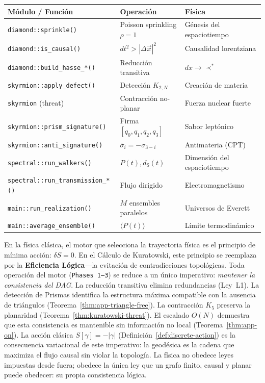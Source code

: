 \documentclass[11pt, a4paper, openany]{book}
\newcommand{\dS}{d_{\mathrm{S}}}
\newcommand{\covers}{\prec^{\!*}}
\begin{document}
\medskip
\begin{center}
\small
\begin{tabular}{p{4.5cm}ll}
\toprule
\textbf{M\'odulo / Funci\'on} & \textbf{Operaci\'on} &
  \textbf{F\'isica} \\
\midrule
\texttt{diamond::sprinkle()}
  & Poisson sprinkling $\rho = 1$
  & G\'enesis del espaciotiempo \\
\texttt{diamond::is\_causal()}
  & $dt^2 > |\Delta\vec{x}|^2$
  & Causalidad lorentziana \\
\texttt{diamond::build\_hasse\_*()}
  & Reducci\'on transitiva
  & $dx \to \covers$ \\
\texttt{skyrmion::apply\_defect()}
  & Detecci\'on $K_{2,N}$
  & Creaci\'on de materia \\
\texttt{skyrmion} (threat)
  & Contracci\'on no-planar
  & Fuerza nuclear fuerte \\
\texttt{skyrmion::prism\_signature()}
  & Firma $[q_0,q_1,q_2,q_3]$
  & Sabor lept\'onico \\
\texttt{skyrmion::anti\_signature()}
  & $\bar{\sigma}_i = -\sigma_{3-i}$
  & Antimateria (CPT) \\
\texttt{spectral::run\_walkers()}
  & $P(t), \dS(t)$
  & Dimensi\'on del espaciotiempo \\
\texttt{spectral::run\_transmission\_*()}
  & Flujo dirigido
  & Electromagnetismo \\
\texttt{main::run\_realization()}
  & $M$ ensembles paralelos
  & Universos de Everett \\
\texttt{main::average\_ensemble()}
  & $\langle P(t)\rangle$
  & L\'imite termodin\'amico \\
\bottomrule
\end{tabular}
\end{center}

\bigskip\noindent
\begin{result}[title={Eficiencia L\'ogica como Motor de la
F\'isica}]
\label{res:logical-efficiency}
En la f\'isica cl\'asica, el motor que selecciona la trayectoria
f\'isica es el principio de m\'inima acci\'on: $\delta S = 0$.
En el C\'alculo de Kuratowski, este principio se reemplaza por la
\textbf{Eficiencia L\'ogica}---la evitaci\'on de contradicciones
topol\'ogicas. Toda operaci\'on del motor (\texttt{Phases 1--3})
se reduce a un \'unico imperativo: \emph{mantener la consistencia
del DAG}. La reducci\'on transitiva elimina redundancias (Ley~L1).
La detecci\'on de Prismas identifica la estructura m\'axima
compatible con la ausencia de tri\'angulos
(Teorema~\ref{thm:app-triangle-free}). La contracci\'on $K_5$
preserva la planaridad (Teorema~\ref{thm:kuratowski-threat}). El
escalado $O(N)$ demuestra que esta consistencia es mantenible
sin informaci\'on no local
(Teorema~\ref{thm:app-on}). La acci\'on cl\'asica $S[\gamma]
= -|\gamma|$ (Definici\'on~\ref{def:discrete-action}) es la
consecuencia variacional de este imperativo: la geod\'esica es la
cadena que maximiza el flujo causal sin violar la topolog\'ia. La
f\'isica no obedece leyes impuestas desde fuera; obedece la
\'unica ley que un grafo finito, causal y planar puede obedecer:
su propia consistencia l\'ogica.
\end{result}
\end{document}
